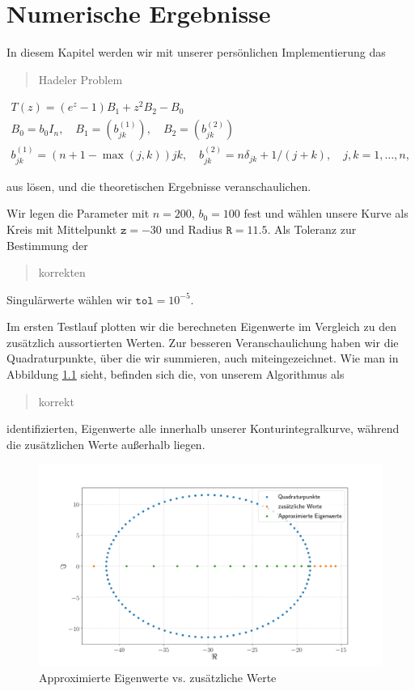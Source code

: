 \chapter{Numerische Ergebnisse}

In diesem Kapitel werden wir mit unserer persönlichen Implementierung das \blockquote{Hadeler Problem}

\begin{gather*}
    T(z) = (e^z - 1) B_1 + z^2 B_2 - B_0 \\
    B_0 = b_0 I_n,
    \quad
    B_1 = (b_{j k}^{(1)}),
    \quad
    B_2 = (b_{j k}^{(2)}) \\
    b_{j k}^{(1)} = (n + 1 - \max(j, k)) j k,
    \quad
    b_{j k}^{(2)} = n \delta_{j k} + 1 / (j + k),
    \quad
    j, k = 1, \dots, n,
\end{gather*}

aus \cite{saad2020rational} lösen, und die theoretischen Ergebnisse veranschaulichen.

Wir legen die Parameter mit $n = 200$, $b_0 = 100$ fest und wählen unsere Kurve als Kreis mit Mittelpunkt $\texttt{z} = -30$ und Radius $\texttt{R} = 11.5$.
Als Toleranz zur Bestimmung der \blockquote{korrekten} Singulärwerte wählen wir $\texttt{tol} = 10^{-5}$.

Im ersten Testlauf plotten wir die berechneten Eigenwerte im Vergleich zu den zusätzlich aussortierten Werten.
Zur besseren Veranschaulichung haben wir die Quadraturpunkte, über die wir summieren, auch miteingezeichnet.
Wie man in Abbildung \ref{fig:plot1} sieht, befinden sich die, von unserem Algorithmus als \blockquote{korrekt} identifizierten, Eigenwerte alle innerhalb unserer Konturintegralkurve, während die zusätzlichen Werte außerhalb liegen.

\begin{figure}[H]
  \includegraphics[width = \linewidth]{Plots/eigenwerte_complex_plot.png}
  \caption{Approximierte Eigenwerte vs. zusätzliche Werte}
  \label{fig:plot1}
\end{figure}



